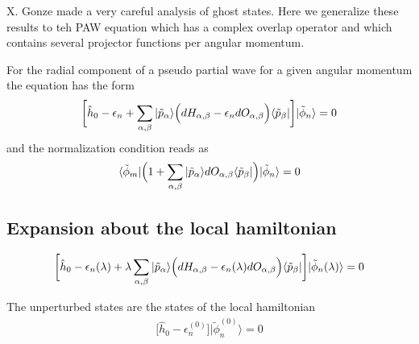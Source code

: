\documentclass[11pt,a4paper]{report}
\begin{document}
X. Gonze made a very careful analysis of ghost
states\cite{gonze91_prb44_8503}. Here we generalize these results to
teh PAW equation which has a complex overlap operator and which
contains several projector functions per angular momentum.

For the radial component of a pseudo partial wave for a given angular
momentum the equation has the form
\begin{eqnarray}
\biggl[\hat{h}_0-\epsilon_n+\sum_{\alpha,\beta}|\tilde{p}_\alpha\rangle
\Bigl(dH_{\alpha,\beta}-\epsilon_n dO_{\alpha,\beta}\Bigr)
\langle\tilde{p}_\beta|\biggr]|\tilde{\phi}_n\rangle=0
\end{eqnarray}
and the normalization condition reads as
\begin{eqnarray}
\langle\tilde{\phi}_m|\Bigl(1+\sum_{\alpha,\beta}|\tilde{p}_\alpha\rangle
dO_{\alpha,\beta}
\langle\tilde{p}_\beta|\Bigr)|\tilde{\phi}_n\rangle=0
\end{eqnarray}

\subsection{Expansion about the local hamiltonian}
\begin{eqnarray}
\biggl[\hat{h}_0-\epsilon_n(\lambda)+\lambda 
\sum_{\alpha,\beta}|\tilde{p}_\alpha\rangle
\Bigl(dH_{\alpha,\beta}-\epsilon_n(\lambda) dO_{\alpha,\beta}\Bigr)
\langle\tilde{p}_\beta|\biggr]|\tilde{\phi}_n(\lambda)\rangle=0
\end{eqnarray}

The unperturbed states are the states of the local hamiltonian
\begin{eqnarray}
\biggl[\hat{h}_0-\epsilon_n^{(0)}\biggr]|\tilde{\phi}_n^{(0)}\rangle=0
\end{eqnarray}
\end{document}
